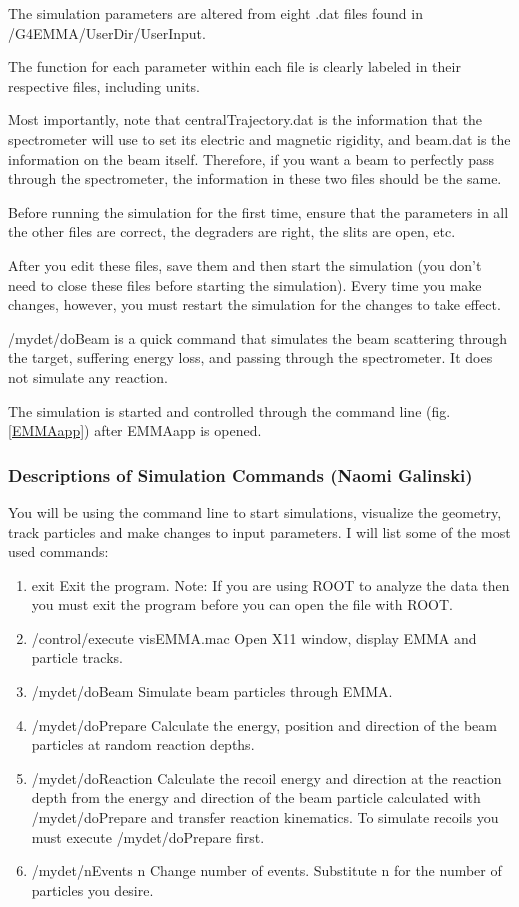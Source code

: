 \documentclass{article}
\newcommand{\filefont}[1]{{\fontfamily{pnc}\selectfont #1}\xspace}
\begin{document}
The simulation parameters are altered from eight .dat files found in \filefont{[path to]/G4EMMA/UserDir/UserInput}. 

The function for each parameter within each file is clearly labeled in their respective files, including units. 

Most importantly, note that centralTrajectory.dat is the information that the spectrometer will use to set its electric and magnetic rigidity, and beam.dat is the information on the beam itself. Therefore, if you want a beam to perfectly pass through the spectrometer, the information in these two files should be the same. 

Before running the simulation for the first time, ensure that the parameters in all the other files are correct, the degraders are right, the slits are open, etc. 

After you edit these files, save them and then start the simulation (you don't need to close these files before starting the simulation). Every time you make changes, however, you must restart the simulation for the changes to take effect. 

\filefont{/mydet/doBeam} is a quick command that simulates the beam scattering through the target, suffering energy loss, and passing through the spectrometer. It does not simulate any reaction.

The simulation is started and controlled through the command line (fig. \ref{EMMAapp}) after EMMAapp is opened. 

\subsubsection{Descriptions of Simulation Commands (Naomi Galinski)}

You will be using the command line to start simulations, visualize the geometry, track particles and make changes to input parameters. I will list some of the most used commands:

\begin{enumerate}
\item \filefont{exit} Exit the program. Note: If you are using ROOT to analyze the data then you must exit the program before you can open the file with ROOT.
\item \filefont{/control/execute visEMMA.mac} Open X11 window, display EMMA and particle tracks.
\item \filefont{/mydet/doBeam} Simulate beam particles through EMMA.
\item \filefont{/mydet/doPrepare} Calculate the energy, position and direction of the beam particles at random reaction depths.
\item \filefont{/mydet/doReaction} Calculate the recoil energy and direction at the reaction depth from the energy and direction of the beam particle calculated with \filefont{/mydet/doPrepare} and transfer reaction kinematics. To simulate recoils you must execute \filefont{/mydet/doPrepare} first.
\item \filefont{/mydet/nEvents n} Change number of events. Substitute \filefont{n} for the number of particles you desire.

\end{enumerate}
\end{document}
